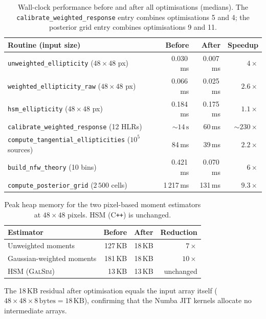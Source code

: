 \begin{table}[h]
\centering
\caption{Wall-clock performance before and after all optimisations (medians).
         The \texttt{calibrate\_weighted\_response} entry combines optimisations
         5 and 4; the posterior grid entry combines optimisations 9 and 11.}
\label{tab:perf}
\small
\begin{tabular}{lrrr}
\hline
\textbf{Routine (input size)} & \textbf{Before} & \textbf{After} & \textbf{Speedup} \\
\hline
\texttt{unweighted\_ellipticity} ($48\times48$ px) & 0.030\,ms & 0.007\,ms & $4\times$ \\
\texttt{weighted\_ellipticity\_raw} ($48\times48$ px) & 0.066\,ms & 0.025\,ms & $2.6\times$ \\
\texttt{hsm\_ellipticity} ($48\times48$ px) & 0.184\,ms & 0.175\,ms & $1.1\times$ \\
\texttt{calibrate\_weighted\_response} (12 HLRs) & ${\sim}14\,\mathrm{s}$ & 60\,ms & ${\sim}230\times$ \\
\texttt{compute\_tangential\_ellipticities} ($10^5$ sources) & 84\,ms & 39\,ms & $2.2\times$ \\
\texttt{build\_nfw\_theory} (10 bins) & 0.421\,ms & 0.070\,ms & $6\times$ \\
\texttt{compute\_posterior\_grid} ($2\,500$ cells) & 1\,217\,ms & 131\,ms & $9.3\times$ \\
\hline
\end{tabular}
\end{table}

\begin{table}[h]
\centering
\caption{Peak heap memory for the two pixel-based moment estimators at
         $48\times48$ pixels. HSM (C\texttt{++}) is unchanged.}
\label{tab:mem}
\begin{tabular}{lrrr}
\hline
\textbf{Estimator} & \textbf{Before} & \textbf{After} & \textbf{Reduction} \\
\hline
Unweighted moments & 127\,KB & 18\,KB & $7\times$ \\
Gaussian-weighted moments & 181\,KB & 18\,KB & $10\times$ \\
HSM (\textsc{GalSim}) & 13\,KB & 13\,KB & unchanged \\
\hline
\end{tabular}
\end{table}

The 18\,KB residual after optimisation equals the input array itself
($48 \times 48 \times 8\,\mathrm{bytes} = 18\,\mathrm{KB}$), confirming that
the Numba JIT kernels allocate no intermediate arrays.

